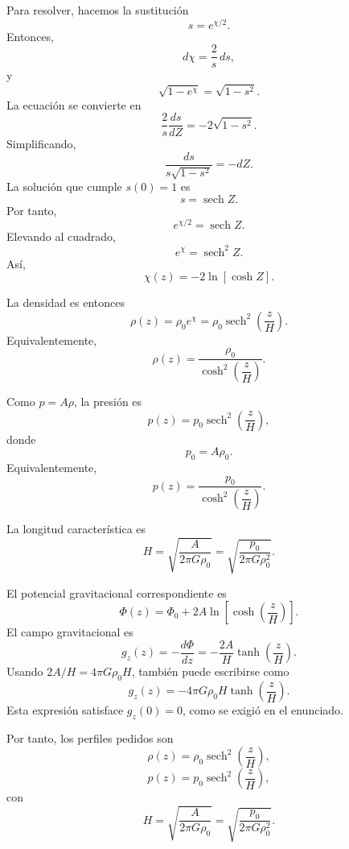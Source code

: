 \documentclass[a4paper]{article}
\begin{document}
Para resolver, hacemos la sustitución
$$
s=e^{\chi/2}.
$$
Entonces,
$$
d\chi=\frac{2}{s}\,ds,
$$
y
$$
\sqrt{1-e^\chi}=\sqrt{1-s^2}.
$$
La ecuación se convierte en
$$
\frac{2}{s}\frac{ds}{dZ}=-2\sqrt{1-s^2}.
$$
Simplificando,
$$
\frac{ds}{s\sqrt{1-s^2}}=-dZ.
$$
La solución que cumple $s(0)=1$ es
$$
s=\operatorname{sech}Z.
$$
Por tanto,
$$
e^{\chi/2}=\operatorname{sech}Z.
$$
Elevando al cuadrado,
$$
e^\chi=\operatorname{sech}^2 Z.
$$
Así,
$$
\chi(z)=-2\ln[\cosh Z].
$$

La densidad es entonces
$$
\rho(z)=\rho_0 e^\chi
=
\rho_0\operatorname{sech}^2\left(\frac{z}{H}\right).
$$
Equivalentemente,
$$
\rho(z)=\frac{\rho_0}{\cosh^2\left(\dfrac{z}{H}\right)}.
$$

Como $p=A\rho$, la presión es
$$
p(z)=p_0\operatorname{sech}^2\left(\frac{z}{H}\right),
$$
donde
$$
p_0=A\rho_0.
$$
Equivalentemente,
$$
p(z)=\frac{p_0}{\cosh^2\left(\dfrac{z}{H}\right)}.
$$

La longitud característica es
$$
H=\sqrt{\frac{A}{2\pi G\rho_0}}
=
\sqrt{\frac{p_0}{2\pi G\rho_0^2}}.
$$

El potencial gravitacional correspondiente es
$$
\Phi(z)=\Phi_0+2A\ln\left[\cosh\left(\frac{z}{H}\right)\right].
$$
El campo gravitacional es
$$
g_z(z)=-\frac{d\Phi}{dz}
=
-\frac{2A}{H}\tanh\left(\frac{z}{H}\right).
$$
Usando $2A/H=4\pi G\rho_0 H$, también puede escribirse como
$$
g_z(z)=
-4\pi G\rho_0 H
\tanh\left(\frac{z}{H}\right).
$$
Esta expresión satisface $g_z(0)=0$, como se exigió en el enunciado.

Por tanto, los perfiles pedidos son
$$
\rho(z)=\rho_0\operatorname{sech}^2\left(\frac{z}{H}\right),
$$
$$
p(z)=p_0\operatorname{sech}^2\left(\frac{z}{H}\right),
$$
con
$$
H=\sqrt{\frac{A}{2\pi G\rho_0}}
=
\sqrt{\frac{p_0}{2\pi G\rho_0^2}}.
$$
\end{document}
